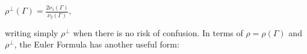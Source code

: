 $\rho^{\perp}(\Gamma) = \frac{2\nu_1(\Gamma)}{\nu_2(\Gamma)}$,

writing simply $\rho^{\perp}$ when there is no risk of confusion. In terms of $\rho = \rho(\Gamma)$ and $\rho^{\perp}$, the Euler Formula has another useful form:
